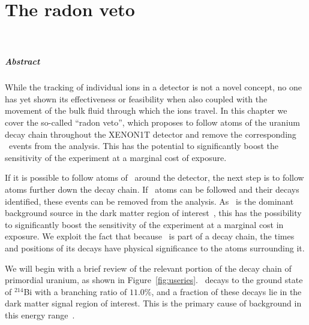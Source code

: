 
\chapter{The radon veto}~\label{ch:rnveto}

\paragraph{Abstract} While the tracking of individual ions in a detector is not a novel concept, no one has yet shown its effectiveness or feasibility when also coupled with the movement of the bulk fluid through which the ions travel. In this chapter we cover the so-called ``radon veto'', which proposes to follow atoms of the uranium decay chain throughout the XENON1T detector and remove the corresponding \Pb~events from the analysis. This has the potential to significantly boost the sensitivity of the experiment at a marginal cost of exposure.

If it is possible to follow atoms of \Po~around the detector, the next step is to follow atoms further down the decay chain. If \Pb~atoms can be followed and their decays identified, these events can be removed from the analysis. As \Pb~is the dominant background source in the dark matter region of interest~\cite{Aprile:2015uzo}, this has the possibility to significantly boost the sensitivity of the experiment at a marginal cost in exposure. We exploit the fact that because \Pb~is part of a decay chain, the times and positions of its decays have physical significance to the atoms surrounding it.

We will begin with a brief review of the relevant portion of the decay chain of primordial uranium, as shown in Figure~\ref{fig:useries}. \Pb~decays to the ground state of $^{214}$Bi with a branching ratio of $11.0\%$, and a fraction of these decays lie in the dark matter signal region of interest. This is the primary cause of background in this energy range~\cite{Aprile:2015uzo}.

